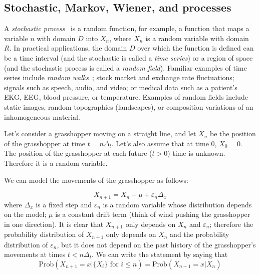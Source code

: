 \documentclass[justified, sixbynine]{tufte-book}
\theoremstyle{plain}%
\newtheorem * {corollary}{Corollary}
\theoremstyle{definition}
\theoremstyle{remark}
\newtheorem * {remark}{Remark}
\newtheorem * {note}{Note}
\begin{document}
\begin{fullwidth}
\goodbreak\section{Stochastic, Markov, Wiener, and processes}


A {\it stochastic process}~\cite{stochastic} is a random function,
for example, a function that maps a
variable $n$ with domain $D$ into $X_n$, where $X_n$ is a random variable
with domain $R$. In practical applications, the domain $D$ over which the
function is defined can be a time interval (and the stochastic is called a
{\it time series}) or a region of space (and the stochastic process is
called a {\it random field}). Familiar examples of time series include {\it %
random walks}~\cite{rwalk}; stock market and exchange rate fluctuations; signals such as
speech, audio, and video; or medical data such as a patient's EKG, EEG, blood
pressure, or temperature. Examples of random fields include static images,
random topographies (landscapes), or composition variations of an
inhomogeneous material.

Let's consider a grasshopper moving on a straight line, and let $X_n$ be the
position of the grasshopper at time $t=n\Delta _t$. Let's also assume that at time 0,
$X_0=0$. The position of the grasshopper at each future ($t>0$) time is unknown.
Therefore it is a random variable.

We can model the movements of the grasshopper as follows:

\begin{equation}
X_{n+1}=X_n + \mu + \varepsilon _n\Delta _x  \label{markov1}
\end{equation}
where $\Delta _x$ is a fixed step and $\varepsilon _n$ is a random variable
whose distribution depends on the model; $\mu$ is a constant drift term
(think of wind pushing the grasshopper in one direction).
It is clear that $X_{n+1}$ only
depends on $X_n$ and $\varepsilon _n$; therefore the probability distribution
of $X_{n+1}$ only depends on $X_n$ and the probability distribution of $%
\varepsilon _n$, but it does not depend on the past history of the grasshopper's movements at
times $t<n\Delta _t$. We can write the statement by saying that
\begin{equation}
\textrm{Prob}(X_{n+1}=x|\{X_i\}\text{ for }i\leq n)=\textrm{Prob}(X_{n+1}=x|X_n)  \label{markov2}
\end{equation}


\end{fullwidth}
\end{document}
